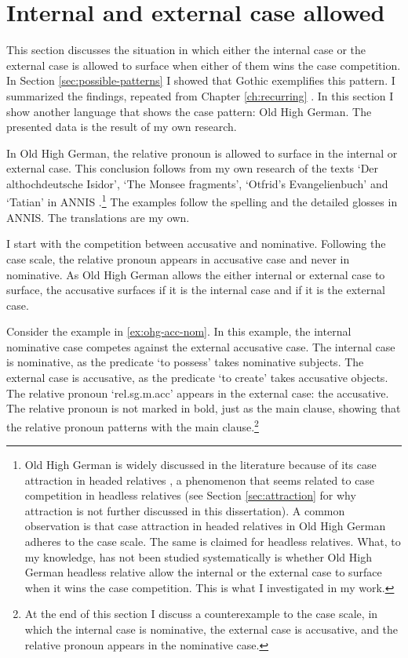 \section{Internal and external case allowed}\label{sec:pattern-i}

This section discusses the situation in which either the internal case or the external case is allowed to surface when either of them wins the case competition. In Section \ref{sec:possible-patterns} I showed that Gothic exemplifies this pattern. I summarized the findings, repeated from Chapter \ref{ch:recurring} \citep{harbert1978}. In this section I show another language that shows the case pattern: Old High German. The presented data is the result of my own research.

In Old High German, the relative pronoun is allowed to surface in the internal or external case. This conclusion follows from my own research of the texts `Der althochdeutsche Isidor', `The Monsee fragments', `Otfrid's Evangelienbuch' and `Tatian' in ANNIS \citep{krause2016}.\footnote{
Old High German is widely discussed in the literature because of its case attraction in headed relatives \citep[cf.][]{pittner1995}, a phenomenon that seems related to case competition in headless relatives (see Section \ref{sec:attraction} for why attraction is not further discussed in this dissertation).
A common observation is that case attraction in headed relatives in Old High German adheres to the case scale. The same is claimed for headless relatives.
What, to my knowledge, has not been studied systematically is whether Old High German headless relative allow the internal or the external case to surface when it wins the case competition. This is what I investigated in my work.
}
The examples follow the spelling and the detailed glosses in ANNIS. The translations are my own.

I start with the competition between accusative and nominative. Following the case scale, the relative pronoun appears in accusative case and never in nominative. As Old High German allows the either internal or external case to surface, the accusative surfaces if it is the internal case and if it is the external case.

Consider the example in \ref{ex:ohg-acc-nom}. In this example, the internal nominative case competes against the external accusative case.
The internal case is nominative, as the predicate  `to possess' takes nominative subjects.
The external case is accusative, as the predicate  `to create' takes accusative objects.
The relative pronoun  `\ac{rel}.\ac{sg}.\ac{m}.\ac{acc}' appears in the external case: the accusative. The relative pronoun is not marked in bold, just as the main clause, showing that the relative pronoun patterns with the main clause.\footnote{
At the end of this section I discuss a counterexample to the case scale, in which the internal case is nominative, the external case is accusative, and the relative pronoun appears in the nominative case.
}

